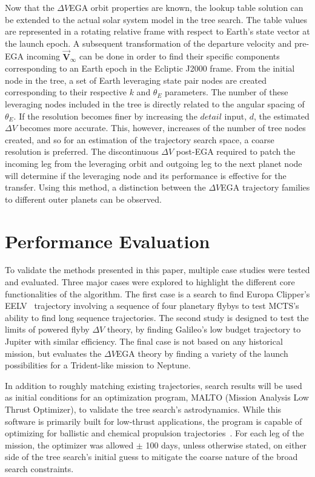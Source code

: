 \documentclass[letterpaper, preprint, paper,11pt]{AAS}	%
\begin{document}
Now that the $\Delta V$EGA orbit properties are known, the lookup table solution can be extended to the actual solar system model in the tree search. The table values are represented in a rotating relative frame with respect to Earth's state vector at the launch epoch. A subsequent transformation of the departure velocity and pre-EGA incoming $\vec{\textbf{V}}_{\infty}$ can be done in order to find their specific components corresponding to an Earth epoch in the Ecliptic J2000 frame. From the initial node in the tree, a set of Earth leveraging state pair nodes are created corresponding to their respective $k$ and $\theta_E$ parameters. The number of these leveraging nodes included in the tree is directly related to the angular spacing of $\theta_E$. If the resolution becomes finer by increasing the $\textit{detail}$ input, $d$, the estimated $\Delta V$ becomes more accurate. This, however, increases of the number of tree nodes created, and so for an estimation of the trajectory search space, a coarse resolution is preferred. The discontinuous $\Delta V$ post-EGA required to patch the incoming leg from the leveraging orbit and outgoing leg to the next planet node will determine if the leveraging node and its performance is effective for the transfer. Using this method, a distinction between the $\Delta V$EGA trajectory families to different outer planets can be observed.

\section*{Performance Evaluation}

To validate the methods presented in this paper, multiple case studies were tested and evaluated. Three major cases were explored to highlight the different core functionalities of the algorithm. The first case is a search to find Europa Clipper's EELV~\cite{Buffington2014} trajectory involving a sequence of four planetary flybys to test MCTS's ability to find long sequence trajectories. The second study is designed to test the limits of powered flyby $\Delta V$ theory, by finding Galileo's low budget trajectory to Jupiter with similar efficiency. The final case is not based on any historical mission, but evaluates the $\Delta V$EGA theory by finding a variety of the launch possibilities for a Trident-like mission to Neptune.

In addition to roughly matching existing trajectories, search results will be used as initial conditions for an optimization program, MALTO (Mission Analysis Low Thrust Optimizer), to validate the tree search's astrodynamics. While this software is primarily built for low-thrust applications, the program is capable of optimizing for ballistic and chemical propulsion trajectories~\cite{Sims2006}. For each leg of the mission, the optimizer was allowed $\pm$ 100 days, unless otherwise stated, on either side of the tree search's initial guess to mitigate the coarse nature of the broad search constraints.
\end{document}
